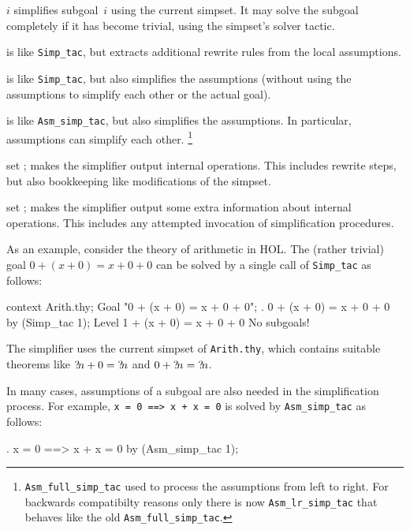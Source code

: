 \begin{ttdescription}
\item[\ttindexbold{Simp_tac} $i$] simplifies subgoal~$i$ using the
  current simpset.  It may solve the subgoal completely if it has
  become trivial, using the simpset's solver tactic.
  
\item[\ttindexbold{Asm_simp_tac}]
  is like \verb$Simp_tac$, but extracts additional rewrite rules from
  the local assumptions.
  
\item[\ttindexbold{Full_simp_tac}] is like \verb$Simp_tac$, but also
  simplifies the assumptions (without using the assumptions to
  simplify each other or the actual goal).
  
\item[\ttindexbold{Asm_full_simp_tac}] is like \verb$Asm_simp_tac$,
  but also simplifies the assumptions. In particular, assumptions can
  simplify each other.
\footnote{\texttt{Asm_full_simp_tac} used to process the assumptions from
  left to right. For backwards compatibilty reasons only there is now
  \texttt{Asm_lr_simp_tac} that behaves like the old \texttt{Asm_full_simp_tac}.}
\item[set \ttindexbold{trace_simp};] makes the simplifier output internal
  operations.  This includes rewrite steps, but also bookkeeping like
  modifications of the simpset.
\item[set \ttindexbold{debug_simp};] makes the simplifier output some extra
  information about internal operations.  This includes any attempted
  invocation of simplification procedures.
\end{ttdescription}

\medskip

As an example, consider the theory of arithmetic in HOL.  The (rather trivial)
goal $0 + (x + 0) = x + 0 + 0$ can be solved by a single call of
\texttt{Simp_tac} as follows:
\begin{ttbox}
context Arith.thy;
Goal "0 + (x + 0) = x + 0 + 0";
{. 0 + (x + 0) = x + 0 + 0}
by (Simp_tac 1);
{\out Level 1}
{ + (x + 0) = x + 0 + 0}
{\out No subgoals!}
\end{ttbox}

The simplifier uses the current simpset of \texttt{Arith.thy}, which
contains suitable theorems like ${?\!n}+0 = {?\!n}$ and $0+{?\!n} =
{?\!n}$.

\medskip In many cases, assumptions of a subgoal are also needed in
the simplification process.  For example, \texttt{x = 0 ==> x + x = 0}
is solved by \texttt{Asm_simp_tac} as follows:
\begin{ttbox}
{. x = 0 ==> x + x = 0}
by (Asm_simp_tac 1);
\end{ttbox}

